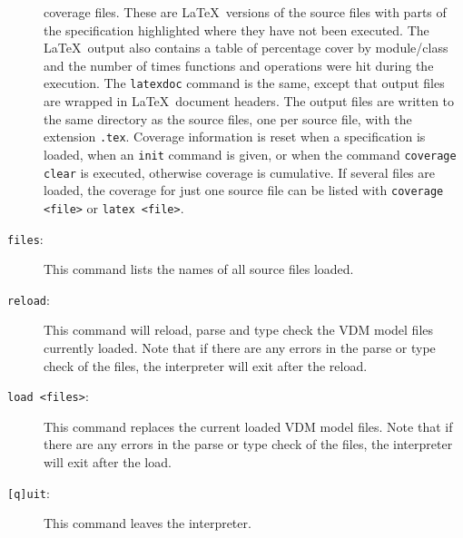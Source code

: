 \documentclass{overturerepchap}
\begin{document}
\begin{description}
  coverage files. These are \LaTeX\ versions of the source files
  with parts of the
  specification highlighted where they have not been executed. The
  \LaTeX\ output also contains a table of percentage cover by
  module/class and the number of times functions and operations were
  hit during the execution. The \texttt{latexdoc} command is the same,
  except that output files are wrapped in \LaTeX\ document headers. The
  output files are written to the same directory as the source files, one
  per source file, with the extension \texttt{.tex}. Coverage
  information is reset when a specification is loaded, when an \texttt{init}
  command is given, or when the
  command \texttt{coverage clear} is executed, otherwise coverage is
  cumulative. If several files are loaded, the coverage for just one
  source file can be listed with \texttt{coverage <file>} or
  \texttt{latex <file>}.  
\item[\texttt{files}:] This command lists the names of all source files loaded.
\item[\texttt{reload}:] This command will reload, parse and type check the
  VDM model files currently loaded. Note that if there are any errors
  in the parse or type check of the files, the interpreter will exit
  after the reload. 
\item[\texttt{load <files>}:] This command replaces the current loaded VDM
  model files. Note that if there are any errors in the parse or type
  check of the files, the interpreter will exit after
  the load.  
\item[\texttt{[q]uit}:] This command leaves the
  interpreter.  
\end{description}



\end{document}
